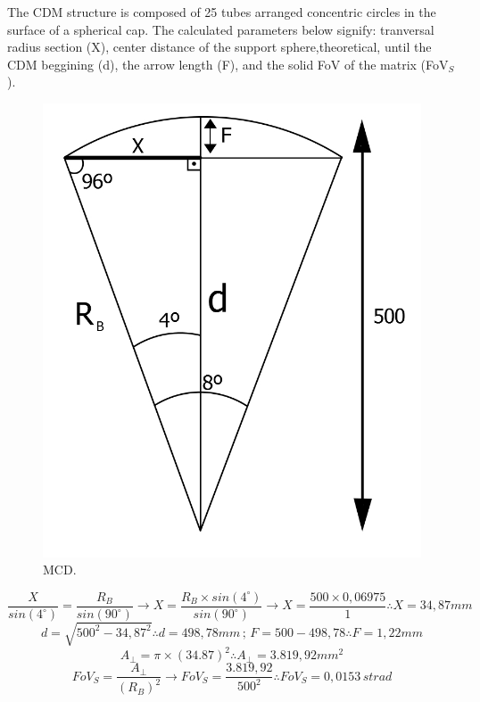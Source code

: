 \documentclass[a4paper,12pt]{article}
\begin{document}
The CDM structure is composed of 25 tubes arranged  concentric circles in the surface of a spherical cap. The  calculated parameters below signify: tranversal radius section (X), center distance of the support sphere,theoretical, until the  CDM beggining (d), the arrow length (F), and the solid FoV of the matrix (FoV$_{S}$).
\begin{figure}[htb] 
	\centering
	\includegraphics[scale=0.25]{img/MCD_2.jpg}
	\caption{MCD.}
\end{figure}
$$ \frac{X}{sin(4^{\circ})} = \frac{R_{B}}{sin(90^{\circ})}\longrightarrow X= \frac{R_{B}\times sin(4^{\circ})}{sin(90^{\circ})} \longrightarrow X=\frac{500\times 0,06975}{1} \therefore X=34,87mm $$
$$d = \sqrt{500^{2} - 34,87^{2}} \therefore d=498,78mm \, ;\, F=500-498,78 \therefore F=1,22mm $$
$$ A_{\bot } = \pi\times(34.87)^{2} \therefore A_{\bot } = 3.819,92mm^{2} $$ 
$$ FoV_{S} = \frac{A_{\bot }}{(R_{B})^{2}} \longrightarrow FoV_{S} =\frac{3.819,92}{500^{2}} \therefore FoV_{S} = 0,0153 \, strad$$ 
\newpage
\end{document}
